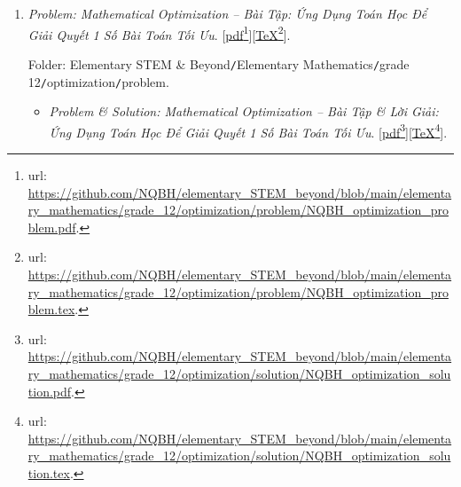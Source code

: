 \documentclass[12pt,oneside]{book}
\begin{document}
\begin{enumerate}
	Folder: {\sf Elementary STEM \& Beyond{\tt/}Elementary Mathematics{\tt/}grade 12{\tt/}discrete random variable{\tt/}problem}.
	\begin{itemize}
		\item {\it Problem \& Solution: Discrete Random Variable \& Its Characteristics -- Bài Tập \& Lời Giải: Biến Ngẫu Nhiên Rời Rạc. Các Số Đặc Trưng Của Biến Ngẫu Nhiên Rời Rạc}. [\href{https://github.com/NQBH/elementary_STEM_beyond/blob/main/elementary_mathematics/grade_12/discrete_random_variable/solution/NQBH_discrete_random_variable_solution.pdf}{pdf}\footnote{{\sc url}: \url{https://github.com/NQBH/elementary_STEM_beyond/blob/main/elementary_mathematics/grade_12/discrete_random_variable/solution/NQBH_discrete_random_variable_solution.pdf}.}][\href{https://github.com/NQBH/elementary_STEM_beyond/blob/main/elementary_mathematics/grade_12/discrete_random_variable/solution/NQBH_discrete_random_variable_solution.tex}{\TeX}\footnote{{\sc url}: \url{https://github.com/NQBH/elementary_STEM_beyond/blob/main/elementary_mathematics/grade_12/discrete_random_variable/solution/NQBH_discrete_random_variable_solution.tex}.}].
		
		Folder: {\sf Elementary STEM \& Beyond{\tt/}Elementary Mathematics{\tt/}grade 12{\tt/}discrete random variable{\tt/}solution}.
	\end{itemize}
	\item {\it Problem: Mathematical Optimization -- Bài Tập: Ứng Dụng Toán Học Để Giải Quyết 1 Số Bài Toán Tối Ưu}. [\href{https://github.com/NQBH/elementary_STEM_beyond/blob/main/elementary_mathematics/grade_12/optimization/problem/NQBH_optimization_problem.pdf}{pdf}\footnote{{\sc url}: \url{https://github.com/NQBH/elementary_STEM_beyond/blob/main/elementary_mathematics/grade_12/optimization/problem/NQBH_optimization_problem.pdf}.}][\href{https://github.com/NQBH/elementary_STEM_beyond/blob/main/elementary_mathematics/grade_12/optimization/problem/NQBH_optimization_problem.tex}{\TeX}\footnote{{\sc url}: \url{https://github.com/NQBH/elementary_STEM_beyond/blob/main/elementary_mathematics/grade_12/optimization/problem/NQBH_optimization_problem.tex}.}].
	
	Folder: {\sf Elementary STEM \& Beyond{\tt/}Elementary Mathematics{\tt/}grade 12{\tt/}optimization{\tt/}problem}.
	\begin{itemize}
		\item {\it Problem \& Solution: Mathematical Optimization -- Bài Tập \& Lời Giải: Ứng Dụng Toán Học Để Giải Quyết 1 Số Bài Toán Tối Ưu}. [\href{https://github.com/NQBH/elementary_STEM_beyond/blob/main/elementary_mathematics/grade_12/optimization/solution/NQBH_optimization_solution.pdf}{pdf}\footnote{{\sc url}: \url{https://github.com/NQBH/elementary_STEM_beyond/blob/main/elementary_mathematics/grade_12/optimization/solution/NQBH_optimization_solution.pdf}.}][\href{https://github.com/NQBH/elementary_STEM_beyond/blob/main/elementary_mathematics/grade_12/optimization/solution/NQBH_optimization_solution.tex}{\TeX}\footnote{{\sc url}: \url{https://github.com/NQBH/elementary_STEM_beyond/blob/main/elementary_mathematics/grade_12/optimization/solution/NQBH_optimization_solution.tex}.}].
		

\end{itemize}
\end{enumerate}
\end{document}
